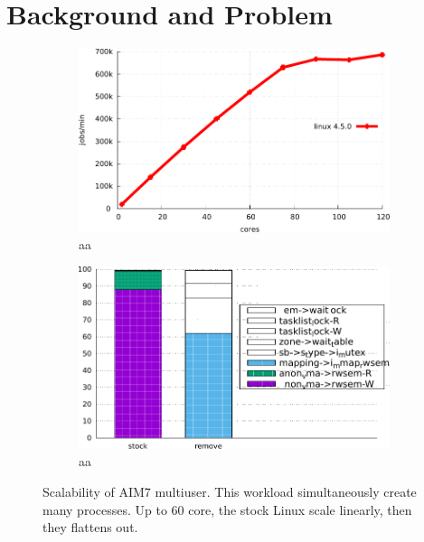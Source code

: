 \section{Background and Problem}


\ifkor
\begin{figure}
  \begin{subfigure}[b]{0.23\textwidth}
    \includegraphics[width=\textwidth]{graph/aim7_default}
    \caption{aa}
  \end{subfigure}%
  \begin{subfigure}[b]{0.25\textwidth}
    \includegraphics[width=\textwidth]{graph/lockstat}
    \caption{aa}
  \end{subfigure}
  \centering
  \caption{Scalability of AIM7 multiuser. This workload simultaneously create
  many processes.
  Up to 60 core, the stock Linux scale linearly, then they flattens out.}
  \label{fig:aim7_default}
\end{figure}

